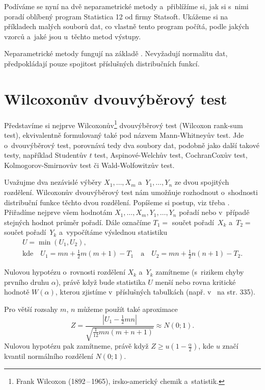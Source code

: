 Podíváme se nyní na dvě neparametrické metody a~přiblížíme si, jak si s~nimi poradí oblíbený program Statistica 12 od firmy Statsoft. Ukážeme si na příkladech malých souborů dat, co vlastně tento program počítá, podle jakých vzorců a~jaké jsou u~těchto metod výstupy.

Neparametrické metody fungují na základě . Nevyžadují normalitu dat, předpokládají pouze spojitost
příslušných distribučních funkcí.

\newpage
\section{Wilcoxonův dvouvýběrový test}

Představíme si nejprve Wilcoxonův\footnote{Frank Wilcoxon (1892\,--\,1965), irsko-americký chemik a~statistik.}
 dvouvýběrový test (Wilcoxon rank-sum test), ekvivalentně formulovaný také pod názvem
Mann-Whitneyův test. Jde o~dvouvýběrový test, porovnává tedy dva soubory dat, podobně jako další takové testy,
například Studentův $t$ test, Aspinové-Welchův test, Cochran\z Coxův test, Kolmogorov-Smirnovův test či Wald-Wolfowitzův test.

Uvažujme dva nezávislé výběry $X_{1},\dots,X_{m}$  a~$Y_{1},\dots,Y_{n}$ ze dvou spojitých rozdělení.
Wilcoxonův dvouvýběrový test nám umožňuje rozhodnout o~shodnosti distribuční funkce těchto dvou rozdělení.
Popíšeme si postup, viz třeba 
\cite{1,2,9}. Přiřadíme nejprve všem hodnotám $X_1,\dots, X_m, Y_1,\dots,Y_n$ pořadí nebo v~případě stejných hodnot průměr pořadí. Dále označíme $T_1=$ součet pořadí~$X_k$ a~$T_2=$ součet pořadí~$Y_k$ a~vypočítáme výslednou statistiku
\begin{gather*}
U=\min(U_1,U_2),\\
\mbox{kde} \quad U_1=mn+\frac12m(m+1) -T_1 \quad  \mbox{a} \quad U_2=mn+\frac12n(n+1) -T_2.
\end{gather*}

Nulovou hypotézu o~rovnosti rozdělení $X_k$ a~$Y_k$ zamítneme (s~rizikem chyby prvního druhu $\alpha$), právě když bude statistika
$U$ menší nebo rovna kritické hodnotě $W(\alpha)$, kterou zjistíme v~příslušných tabulkách (např. v~\cite{1} na str. 335).

 Pro větší rozsahy $m$, $n$ můžeme použít také aproximace
$$ Z=\frac{|U_1-\frac12 mn|}{\sqrt{\frac1{12}mn(m+n+1)}}\approx N(0;1) .$$
Nulovou hypotézu pak zamítneme, právě když $  Z\geq u(1-\tfrac{\alpha}2)$,
kde $u$ značí kvantil normálního rozdělení $N(0 ;1)$.

